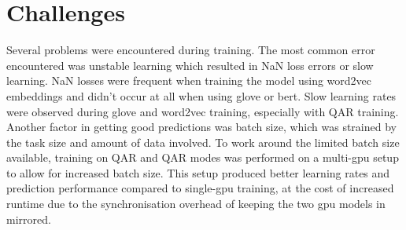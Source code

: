 
\section{Challenges}
\label{sec:experiment-challenges}

Several problems were encountered during training.
The most common error encountered was unstable learning which resulted in NaN loss errors or slow learning.
NaN losses were frequent when training the model using word2vec embeddings and didn't occur at all when using glove or bert.
Slow learning rates were observed during glove and word2vec training, especially with Q\rightarrow{}AR training.
Another factor in getting good predictions was batch size, which was strained by the task size and amount of data involved.
To work around the limited batch size available, training on QA\rightarrow{}R and Q\rightarrow{}AR modes was performed on a multi-gpu setup to allow for increased batch size.
This setup produced better learning rates and prediction performance compared to single-gpu training, at the cost of increased runtime due to the synchronisation overhead of keeping the two gpu models in mirrored.
